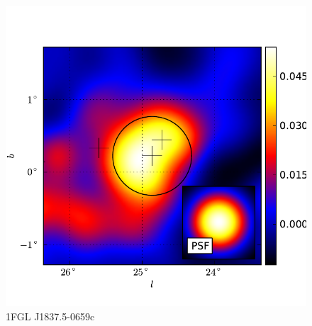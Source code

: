 \documentclass{emulateapj}
\begin{document}
  \begin{figure}
    \begin{center}
      \includegraphics[type=pdf,ext=.pdf,read=.pdf]{source_plots/source_1FGL_J1837.5-0659c}
    \end{center}
    \caption{1FGL J1837.5-0659c}
  \end{figure}
\end{document}
